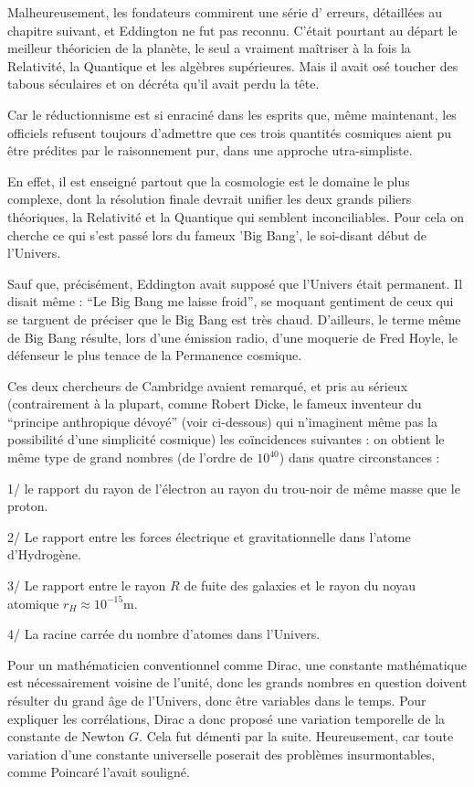 \documentclass[a4paper,12pt]{article}
\begin{document}
Malheureusement, les fondateurs commirent une série d' erreurs, détaillées au chapitre suivant, et Eddington ne fut pas reconnu. C'était pourtant au départ le meilleur théoricien de la planète, le seul a vraiment ma\^itriser à la fois la Relativité, la Quantique et les algèbres supérieures. Mais il avait osé toucher des tabous séculaires et on décréta qu'il avait perdu la tête.

Car le réductionnisme est si enraciné dans les esprits que, m\^eme maintenant, les officiels refusent toujours d'admettre que ces trois quantités cosmiques aient pu être prédites par le raisonnement pur, dans une approche utra-simpliste.

En effet, il est enseigné partout que la cosmologie est le domaine le plus complexe, dont la résolution finale devrait unifier les deux grands piliers théoriques, la Relativité et la Quantique qui semblent inconciliables. Pour cela on cherche ce qui s'est passé lors du fameux 'Big Bang', le soi-disant début de l'Univers.

Sauf que, précisément, Eddington avait supposé que l'Univers était permanent. Il disait même : ``Le Big Bang me laisse froid'', se moquant gentiment de ceux qui se targuent de préciser que le Big Bang est très chaud. D'ailleurs, le terme même de Big Bang résulte, lors d'une émission radio, d'une moquerie de Fred Hoyle, le défenseur le plus tenace de la Permanence cosmique.

     Ces deux chercheurs de Cambridge avaient remarqué, et pris au sérieux (contrairement à la plupart, comme Robert Dicke, le fameux inventeur du ``principe anthropique dévoyé'' (voir ci-dessous) qui n'imaginent même pas la possibilité d'une simplicité cosmique) les coïncidences suivantes : on obtient le même type de grand nombres (de l'ordre de $10^40$) dans quatre circonstances :

1/ le rapport du rayon de l'électron au rayon du trou-noir de même masse que le proton.

2/ Le rapport entre les forces électrique et gravitationnelle dans l'atome d'Hydrogène.

3/ Le rapport entre le rayon $R$ de fuite des galaxies et le rayon du noyau atomique $r_H \approx 10^{-15}$m.

4/ La racine carrée du nombre d'atomes dans l'Univers.


Pour un mathématicien conventionnel comme Dirac, une constante mathématique est nécessairement voisine de l'unité, donc les grands nombres en question doivent résulter du grand âge de l'Univers, donc être variables dans le temps. Pour expliquer les corrélations, Dirac a donc proposé une variation temporelle de la constante de Newton $G$. Cela fut démenti par la suite. Heureusement, car toute variation d'une constante universelle poserait des problèmes insurmontables, comme Poincaré l'avait souligné. 
\end{document}
